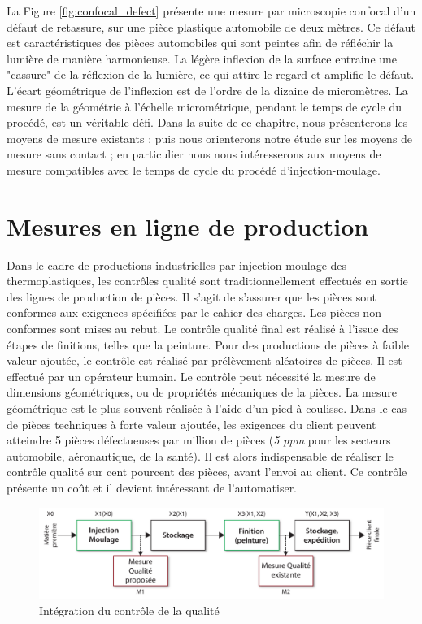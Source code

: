 La Figure \ref{fig:confocal_defect} présente une mesure par microscopie confocal d'un défaut de retassure, sur une pièce plastique automobile de deux mètres.
Ce défaut est caractéristiques des pièces automobiles qui sont peintes afin de réfléchir la lumière de manière harmonieuse.
La légère inflexion de la surface entraine une "cassure" de la réflexion de la lumière, ce qui attire le regard et amplifie le défaut.
L'écart géométrique de l'inflexion est de l'ordre de la dizaine de micromètres.
La mesure de la géométrie à l'échelle micrométrique, pendant le temps de cycle du procédé, est un véritable défi.
Dans la suite de ce chapitre, nous présenterons les moyens de mesure existants ; puis nous orienterons notre étude sur les moyens de mesure sans contact ; en particulier nous nous intéresserons aux moyens de mesure compatibles avec le temps de cycle du procédé d'injection-moulage.

\section{Mesures en ligne de production}
Dans le cadre de productions industrielles par injection-moulage des thermoplastiques, les contrôles qualité sont traditionnellement effectués en sortie des lignes de production de pièces.
Il s'agit de s’assurer que les pièces sont conformes aux exigences spécifiées par le cahier des charges.
Les pièces non-conformes sont mises au rebut.
Le contrôle qualité final est réalisé à l’issue des étapes de finitions, telles que la peinture.
Pour des productions de pièces à faible valeur ajoutée, le contrôle est réalisé par prélèvement aléatoires de pièces.
Il est effectué par un opérateur humain.
Le contrôle peut nécessité la mesure de dimensions géométriques, ou de propriétés mécaniques de la pièces.
La mesure géométrique est le plus souvent réalisée à l'aide d'un pied à coulisse.
Dans le cas de pièces techniques à forte valeur ajoutée, les exigences du client peuvent atteindre 5 pièces défectueuses par million de pièces (\textit{5 ppm} pour les secteurs automobile, aéronautique, de la santé).
Il est alors indispensable de réaliser le contrôle qualité sur cent pourcent des pièces, avant l'envoi au client.
Ce contrôle présente un coût et il devient intéressant de l'automatiser.

\begin{figure}[htbp]
	\centering
	\includegraphics[width=\textwidth]{../Chap2/Figures/integration_controle_qualite.pdf}
	\caption{Intégration du contrôle de la qualité}
	\label{fig:quality_integration}
\end{figure}

